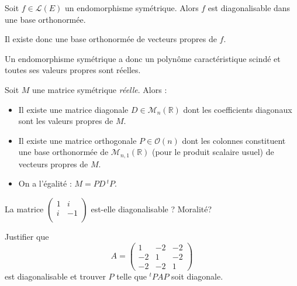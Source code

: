 \documentclass[a4paper,10pt]{report}
\begin{document}
\begin{preuve}
\vspace{5cm}
\end{preuve}

\begin{thm}
Soit $f \in \mathcal{L}(E)$ un endomorphisme symétrique. Alors $f$ est diagonalisable dans une base orthonormée.
\end{thm}

\begin{rems} 
\item Il existe donc une base orthonormée de vecteurs propres de $f$.
\item Un endomorphisme symétrique a donc un polynôme caractéristique scindé et toutes ses valeurs propres sont réelles.
\end{rems}

\begin{thm}
Soit $M$ une matrice symétrique \textit{réelle}. Alors :
\begin{itemize}
\item Il existe une matrice diagonale $D \in \mathcal{M}_n(\mathbb{R})$ dont les coefficients diagonaux sont les valeurs propres de $M$.
\item Il existe une matrice orthogonale $P \in \mathcal{O}(n)$ dont les colonnes constituent une base orthonormée de $\mathcal{M}_{n,1}(\mathbb{R})$ (pour le produit scalaire usuel) de vecteurs propres de $M$.
\item On a l'égalité : $M = P D \, ^tP$.
\end{itemize}
\end{thm}

\begin{exa} La matrice $\begin{pmatrix}
1 &i \\
i & -1 \\
\end{pmatrix}$ est-elle diagonalisable ? Moralité?
\end{exa}

\begin{ex} Justifier que
  \[
  A =
  \begin{pmatrix}
    1 &  - 2 &  - 2 \\
    - 2 & 1 &  - 2 \\
    - 2 &  - 2 & 1
  \end{pmatrix}
  \]
  est diagonalisable et trouver $P$ telle que $^tPAP$ soit diagonale.
  
\vspace{13cm}
\end{ex}
\end{document}
